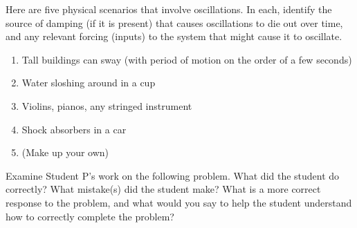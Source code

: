 \documentclass[12pt,letterpaper]{hmcpset}
\begin{document}
\begin{problem}[2]
    Here are five physical scenarios that involve oscillations.  In each, identify the source of damping (if it is present) that causes oscillations to die out over time, and any relevant forcing (inputs) to the system that might cause it to oscillate.
    \begin{enumerate}
        \item Tall buildings can sway (with period of motion on the order of a few seconds)
        \item Water sloshing around in a cup
        \item Violins, pianos, any stringed instrument
        \item Shock absorbers in a car
        \item (Make up your own)
    \end{enumerate}
\end{problem}

\begin{solution}
    \vfill
\end{solution}
\newpage

\begin{problem}[3]
    Examine Student P's work on the following problem.  What did the student do correctly?  What mistake(s) did the student make?  What is a more correct response to the problem, and what would you say to help the student understand how to correctly complete the problem?

    \begin{center}
    \end{center}
\end{problem}
\end{document}
